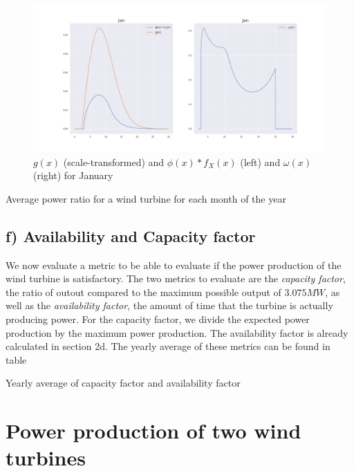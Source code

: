 \documentclass[a4paper]{article}
\begin{document}
\begin{figure}[H]
    \centering
    \includegraphics[width = 1.0\textwidth]{images/janPowerRatio}
    \caption{$g(x)$ (scale-transformed) and $\phi(x)*f_X(x)$ (left) and $\omega(x)$ (right) for January}
    \label{fig:janPowerRatio}
\end{figure}

\begin{table}[H]
    \centering
    \caption{Average power ratio for a wind turbine for each month of the year}
    \label{tab:powercoeff}
    
\end{table}

\subsection*{f) Availability and Capacity factor}
We now evaluate a metric to be able to evaluate if the power production of the wind turbine is satisfactory. The two metrics to evaluate are the \textit{capacity factor}, the ratio of outout compared to the maximum possible output of $3.075MW$, as well as the \textit{availability factor}, the amount of time that the turbine is actually producing power. For the capacity factor, we divide the expected power production by the maximum power production. The availability factor is already calculated in section 2d. The yearly average of these metrics can be found in table %

\begin{table}[H]
    \centering
    \caption{Yearly average of capacity factor and availability factor}
    \label{metrics}
\end{table}

\newpage
\section{Power production of two wind turbines}
\label{sec:twoTurbines}
\end{document}
